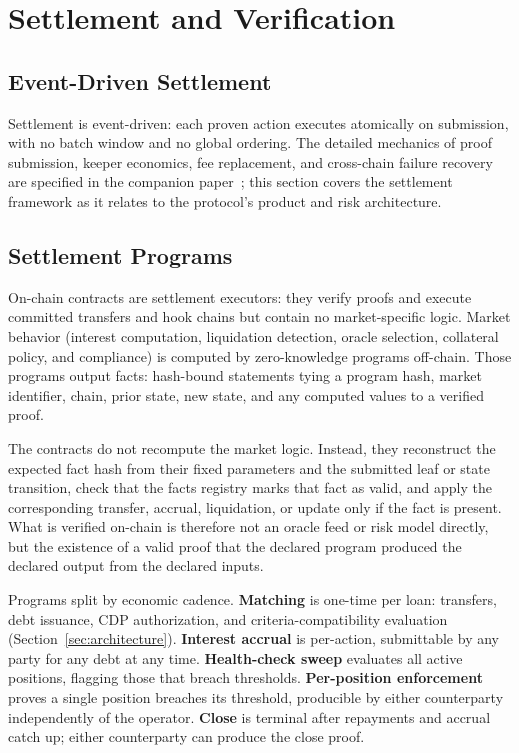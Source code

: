 \section{Settlement and Verification}
\label{sec:settlement}

\subsection{Event-Driven Settlement}

Settlement is event-driven: each proven action executes atomically on submission, with no batch window and no global ordering. The detailed mechanics of proof submission, keeper economics, fee replacement, and cross-chain failure recovery are specified in the companion paper~\cite{daloc-decent2026}; this section covers the settlement framework as it relates to the protocol's product and risk architecture.

\subsection{Settlement Programs}

On-chain contracts are settlement executors: they verify proofs and execute committed transfers and hook chains but contain no market-specific logic. Market behavior (interest computation, liquidation detection, oracle selection, collateral policy, and compliance) is computed by zero-knowledge programs off-chain. Those programs output facts: hash-bound statements tying a program hash, market identifier, chain, prior state, new state, and any computed values to a verified proof.

The contracts do not recompute the market logic. Instead, they reconstruct the expected fact hash from their fixed parameters and the submitted leaf or state transition, check that the facts registry marks that fact as valid, and apply the corresponding transfer, accrual, liquidation, or update only if the fact is present. What is verified on-chain is therefore not an oracle feed or risk model directly, but the existence of a valid proof that the declared program produced the declared output from the declared inputs.

Programs split by economic cadence. \textbf{Matching} is one-time per loan: transfers, debt issuance, CDP authorization, and criteria-compatibility evaluation (Section~\ref{sec:architecture}). \textbf{Interest accrual} is per-action, submittable by any party for any debt at any time. \textbf{Health-check sweep} evaluates all active positions, flagging those that breach thresholds. \textbf{Per-position enforcement} proves a single position breaches its threshold, producible by either counterparty independently of the operator. \textbf{Close} is terminal after repayments and accrual catch up; either counterparty can produce the close proof.

